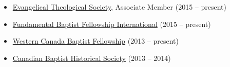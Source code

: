 
\begin{itemize}
\item \href{http://www.etsjets.org/}{Evangelical Theological Society}, Associate Member (2015 -- present)
\item \href{http://fbfi.org/}{Fundamental Baptist Fellowship International} (2015 -- present)
\item \href{http://wcbf.net/}{Western Canada Baptist Fellowship} (2013 -- present)
\item \href{https://www.facebook.com/canadianbaptisthistory}{Canadian Baptist Historical Society} (2013 -- 2014)
\end{itemize}

